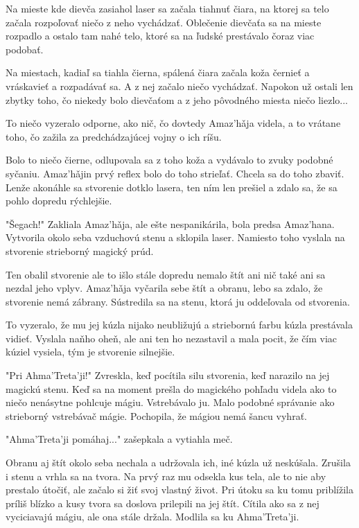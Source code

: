 \documentclass{book}
\begin{document}
Na mieste kde dievča zasiahol laser sa začala tiahnuť čiara, na ktorej sa telo začala rozpoľovať niečo z neho vychádzať. Oblečenie dievčaťa sa na mieste rozpadlo a ostalo tam nahé telo, ktoré sa na ľudské prestávalo čoraz viac podobať.

Na miestach, kadiaľ sa tiahla čierna, spálená čiara začala koža černieť a vráskavieť a rozpadávať sa. A z nej začalo niečo vychádzať. Napokon už ostali len zbytky toho, čo niekedy bolo dievčaťom a z jeho pôvodného miesta niečo liezlo...

To niečo vyzeralo odporne, ako nič, čo dovtedy Amaz'ha\v{}ja videla, a to vrátane toho, čo zažila za predchádzajúcej vojny o ich ríšu.

Bolo to niečo čierne, odlupovala sa z toho koža a vydávalo to zvuky podobné syčaniu. Amaz'ha\v{}jin prvý reflex bolo do toho strieľať. Chcela sa do toho zbaviť. Lenže akonáhle sa stvorenie dotklo lasera, ten ním len prešiel a zdalo sa, že sa pohlo dopredu rýchlejšie.

"$ $Šegach!"$ $ Zakliala Amaz'ha\v{}ja, ale ešte nespanikárila, bola predsa Amaz'hana. Vytvorila okolo seba vzduchovú stenu a sklopila laser. Namiesto toho vyslala na stvorenie strieborný magický prúd.

Ten obalil stvorenie ale to išlo stále dopredu nemalo štít ani nič také ani sa nezdal jeho vplyv. Amaz'ha\v{}ja vyčarila sebe štít a obranu, lebo sa zdalo, že stvorenie nemá zábrany. Sústredila sa na stenu, ktorá ju oddeľovala od stvorenia.

To vyzeralo, že mu jej kúzla nijako neubližujú a striebornú farbu kúzla prestávala vidieť. Vyslala naňho oheň, ale ani ten ho nezastavil a mala pocit, že čím viac kúziel vysiela, tým je stvorenie silnejšie.

"$ $Pri Ahma'Treta'ji!"$ $ Zvreskla, keď pocítila silu stvorenia, keď narazilo na jej magickú stenu. Keď sa na moment prešla do magického pohľadu videla ako to niečo nenásytne pohlcuje mágiu. Vstrebávalo ju. Malo podobné správanie ako strieborný vstrebávač mágie. Pochopila, že mágiou nemá šancu vyhrať.

"$ $Ahma'Treta'ji pomáhaj..."$ $ zašepkala a vytiahla meč.

Obranu aj štít okolo seba nechala a udržovala ich, iné kúzla už neskúšala. Zrušila i stenu a vrhla sa na tvora. Na prvý raz mu odsekla kus tela, ale to nie aby prestalo útočiť, ale začalo si žiť svoj vlastný život. Pri útoku sa ku tomu priblížila príliš blízko a kusy tvora sa doslova prilepili na jej štít. Cítila ako sa z nej vyciciavajú mágiu, ale ona stále držala. Modlila sa ku Ahma'Treta'ji.
\end{document}
